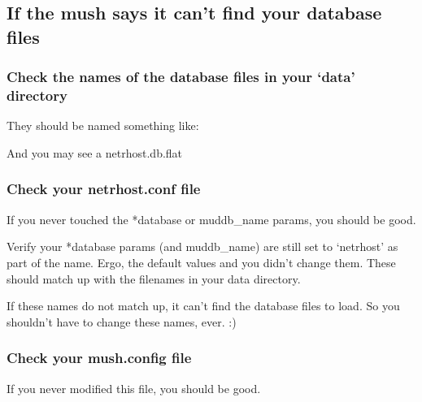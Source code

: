 \documentclass[letterpaper,10pt,english]{sphinxmanual}
\begin{document}
\subsection{If the mush says it can’t find your database files}
\label{\detokenize{troubleshooting:if-the-mush-says-it-can-t-find-your-database-files}}

\subsubsection{Check the names of the database files in your ‘data’ directory}
\label{\detokenize{troubleshooting:check-the-names-of-the-database-files-in-your-data-directory}}
\sphinxAtStartPar
They should be named something like:

\begin{sphinxVerbatim}[commandchars=\\\{\}]
\end{sphinxVerbatim}

\sphinxAtStartPar
And you may see a netrhost.db.flat


\subsubsection{Check your netrhost.conf file}
\label{\detokenize{troubleshooting:check-your-netrhost-conf-file}}
\sphinxAtStartPar
If you never touched the *database or muddb\_name params, you should be good.

\sphinxAtStartPar
Verify your *database params (and muddb\_name) are still set to ‘netrhost’ as
part of the name.  Ergo, the default values and you didn’t change them.
These should match up with the filenames in your data directory.

\sphinxAtStartPar
If these names do not match up, it can’t find the database files to load.
So you shouldn’t have to change these names, ever. :)


\subsubsection{Check your mush.config file}
\label{\detokenize{troubleshooting:check-your-mush-config-file}}
\sphinxAtStartPar
If you never modified this file, you should be good.
\end{document}
